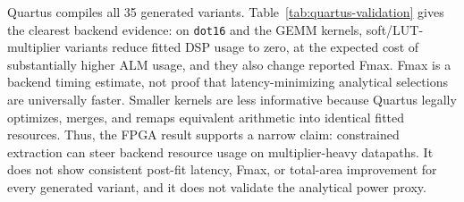 \documentclass[sigplan,10pt,review]{acmart}
\begin{document}
\begin{table}[t]
\caption{Representative RTL/Quartus resource-steering evidence on multiplier-heavy kernels. DSP and ALM are post-fit Quartus resources; Fmax is the reported STA estimate, not a timing-signoff claim. These rows show that LUT-multiplier variants trade DSP blocks for ALMs; they do not establish global optimality or measured power.}
\label{tab:quartus-validation}
\centering
\scriptsize
\setlength{\tabcolsep}{2.5pt}
\end{table}

Quartus compiles all 35 generated variants. Table~\ref{tab:quartus-validation} gives the clearest backend evidence: on \texttt{dot16} and the GEMM kernels, soft/LUT-multiplier variants reduce fitted DSP usage to zero, at the expected cost of substantially higher ALM usage, and they also change reported Fmax. Fmax is a backend timing estimate, not proof that latency-minimizing analytical selections are universally faster. Smaller kernels are less informative because Quartus legally optimizes, merges, and remaps equivalent arithmetic into identical fitted resources. Thus, the FPGA result supports a narrow claim: constrained extraction can steer backend resource usage on multiplier-heavy datapaths. It does not show consistent post-fit latency, Fmax, or total-area improvement for every generated variant, and it does not validate the analytical power proxy.
\end{document}
